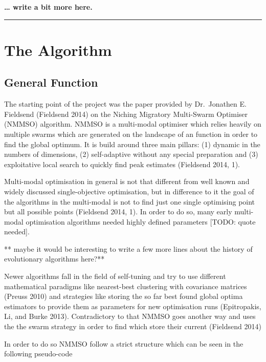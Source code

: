 \documentclass[12pt,a4paper]{article}
\begin{document}
\textbf{\ldots{} write a bit more here.}

\begin{center}\rule{0.5\linewidth}{\linethickness}\end{center}

\section{The Algorithm}\label{the-algorithm}

\subsection{General Function}\label{general-function}

The starting point of the project was the paper provided by Dr.~Jonathen
E. Fieldsend (Fieldsend 2014) on the Niching Migratory Multi-Swarm
Optimiser (NMMSO) algorithm. NMMSO is a multi-modal optimiser which
relies heavily on multiple swarms which are generated on the landscape
of an function in order to find the global optimum. It is build around
three main pillars: (1) dynamic in the numbers of dimensions, (2)
self-adaptive without any special preparation and (3) exploitative local
search to quickly find peak estimates (Fieldsend 2014, 1).

Multi-modal optimisation in general is not that different from well
known and widely discussed single-objective optimisation, but in
difference to it the goal of the algorithms in the multi-modal is not to
find just one single optimising point but all possible points (Fieldsend
2014, 1). In order to do so, many early multi-modal optimisation
algorithms needed highly defined parameters {[}TODO: quote needed{]}.

** maybe it would be interesting to write a few more lines about the
history of evolutionary algorithms here?**

Newer algorithms fall in the field of self-tuning and try to use
different mathematical paradigms like nearest-best clustering with
covariance matrices (Preuss 2010) and strategies like storing the so far
best found global optima estimators to provide them as parameters for
new optimisation runs (Epitropakis, Li, and Burke 2013). Contradictory
to that NMMSO goes another way and uses the the swarm strategy in order
to find which store their current (Fieldsend 2014)

In order to do so NMMSO follow a strict structure which can be seen in
the following pseudo-code
\end{document}
